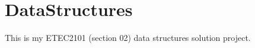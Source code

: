 \chapter{Data\+Structures}
\hypertarget{index}{}\label{index}
\label{index_md__r_e_a_d_m_e}%
%


This is my ETEC2101 (section 02) data structures solution project. 